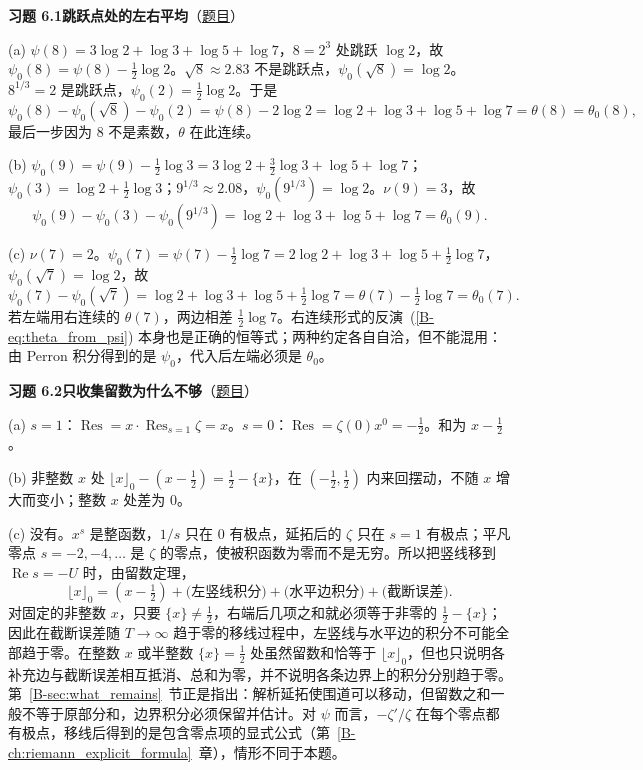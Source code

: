 \documentclass[11pt,a4paper]{article}
\DeclareMathOperator{\Res}{Res}
\renewcommand{\Re}{\operatorname{Re}}
\newcommand{\bref}[1]{\ref*{B-#1}}
\newcommand{\Sol}[2]{%
  \par\addvspace{1.2em}\noindent
  \hypertarget{s:#1}{}\textbf{习题 #1\quad #2}\hfill{\small（\hyperlink{q:#1}{题目}）}\par
  \nopagebreak\smallskip}
\begin{document}
\Sol{6.1}{跳跃点处的左右平均}
(a) $\psi(8)=3\log2+\log3+\log5+\log7$，$8=2^3$ 处跳跃 $\log2$，故 $\psi_0(8)=\psi(8)-\tfrac12\log2$。$\sqrt8\approx2.83$ 不是跳跃点，$\psi_0(\sqrt8)=\log2$。$8^{1/3}=2$ 是跳跃点，$\psi_0(2)=\tfrac12\log2$。于是
\[
  \psi_0(8)-\psi_0(\sqrt8)-\psi_0(2)=\psi(8)-2\log2=\log2+\log3+\log5+\log7=\theta(8)=\theta_0(8),
\]
最后一步因为 $8$ 不是素数，$\theta$ 在此连续。

(b) $\psi_0(9)=\psi(9)-\tfrac12\log3=3\log2+\tfrac32\log3+\log5+\log7$；$\psi_0(3)=\log2+\tfrac12\log3$；$9^{1/3}\approx2.08$，$\psi_0(9^{1/3})=\log2$。$\nu(9)=3$，故
\[
  \psi_0(9)-\psi_0(3)-\psi_0(9^{1/3})=\log2+\log3+\log5+\log7=\theta_0(9).
\]

(c) $\nu(7)=2$。$\psi_0(7)=\psi(7)-\tfrac12\log7=2\log2+\log3+\log5+\tfrac12\log7$，$\psi_0(\sqrt7)=\log2$，故
\[
  \psi_0(7)-\psi_0(\sqrt7)=\log2+\log3+\log5+\tfrac12\log7=\theta(7)-\tfrac12\log7=\theta_0(7).
\]
若左端用右连续的 $\theta(7)$，两边相差 $\tfrac12\log7$。右连续形式的反演~(\bref{eq:theta_from_psi}) 本身也是正确的恒等式；两种约定各自自洽，但不能混用：由 Perron 积分得到的是 $\psi_0$，代入后左端必须是 $\theta_0$。

\Sol{6.2}{只收集留数为什么不够}
(a) $s=1$：$\Res=x\cdot\Res_{s=1}\zeta=x$。$s=0$：$\Res=\zeta(0)x^0=-\tfrac12$。和为 $x-\tfrac12$。

(b) 非整数 $x$ 处 $\lfloor x\rfloor_0-(x-\tfrac12)=\tfrac12-\{x\}$，在 $(-\tfrac12,\tfrac12)$ 内来回摆动，不随 $x$ 增大而变小；整数 $x$ 处差为 $0$。

(c) 没有。$x^s$ 是整函数，$1/s$ 只在 $0$ 有极点，延拓后的 $\zeta$ 只在 $s=1$ 有极点；平凡零点 $s=-2,-4,\dots$ 是 $\zeta$ 的零点，使被积函数为零而不是无穷。所以把竖线移到 $\Re s=-U$ 时，由留数定理，
\[
  \lfloor x\rfloor_0=(x-\tfrac12)+\bigl(\text{左竖线积分}\bigr)+\bigl(\text{水平边积分}\bigr)+\bigl(\text{截断误差}\bigr).
\]
对固定的非整数 $x$，只要 $\{x\}\ne\tfrac12$，右端后几项之和就必须等于非零的 $\tfrac12-\{x\}$；因此在截断误差随 $T\to\infty$ 趋于零的移线过程中，左竖线与水平边的积分不可能全部趋于零。在整数 $x$ 或半整数 $\{x\}=\tfrac12$ 处虽然留数和恰等于 $\lfloor x\rfloor_0$，但也只说明各补充边与截断误差相互抵消、总和为零，并不说明各条边界上的积分分别趋于零。第~\bref{sec:what_remains}~节正是指出：解析延拓使围道可以移动，但留数之和一般不等于原部分和，边界积分必须保留并估计。对 $\psi$ 而言，$-\zeta'/\zeta$ 在每个零点都有极点，移线后得到的是包含零点项的显式公式（第~\bref{ch:riemann_explicit_formula}~章），情形不同于本题。
\end{document}
